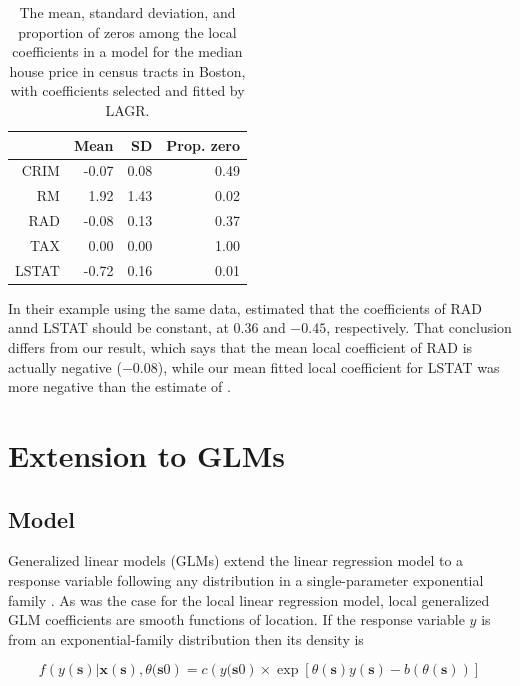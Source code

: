 \documentclass[authoryear,review, 12pt]{elsarticle}
\begin{document}
\begin{table}
\centering
\begin{tabular}{rrrr}
  & Mean & SD & Prop. zero \\ 
  \hline
CRIM & -0.07 & 0.08 & 0.49 \\ 
  RM & 1.92 & 1.43 & 0.02 \\ 
  RAD & -0.08 & 0.13 & 0.37 \\ 
  TAX & 0.00 & 0.00 & 1.00 \\ 
  LSTAT & -0.72 & 0.16 & 0.01 \\ 
  \end{tabular}
\caption{The mean, standard deviation, and proportion of zeros among the local coefficients in a model for the median house price in census tracts in Boston, with coefficients selected and fitted by LAGR.} 
\label{tab:boston-coefs-lagr}
\end{table}


In their example using the same data, \citet{Sun-Yan-Zhang-Lu-2014}
estimated that the coefficients of RAD annd LSTAT should be constant,
at $0.36$ and $-0.45$, respectively. That conclusion differs from
our result, which says that the mean local coefficient of RAD is actually
negative (\ensuremath{-0.08}), while
our mean fitted local coefficient for LSTAT was more negative than
the estimate of \citet{Sun-Yan-Zhang-Lu-2014}.


\section{Extension to GLMs\label{sec:lagr-gllm}}


\subsection{Model}

Generalized linear models (GLMs) extend the linear regression model
to a response variable following any distribution in a single-parameter
exponential family \citep{McCullagh-Nelder-1989}. As was the case
for the local linear regression model, local generalized GLM coefficients
are smooth functions of location. If the response variable $y$ is
from an exponential-family distribution then its density is 

\[
f\left(y(\bm{s})|\bm{x}(\bm{s}),\theta(\bm{s}0\right)=c\left(y(\bm{s}0\right)\times\exp\left[\theta(\bm{s})y(\bm{s})-b\left(\theta(\bm{s})\right)\right]
\]
\end{document}
